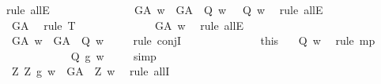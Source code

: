 \begin{isabellebody}
\ {\isacharparenleft}rule\ allE{\isacharparenright}\isanewline
\ \ \ \ \ \ \ \ \ \ \ \isamarkupfalse%
\ {}{\isacharcolon}\ {\isachardoublequoteopen}{\isacharparenleft}{\isasymP}\ G\isactrlsup A\ w\ {\isasymand}\ {\isacharparenleft}G\isactrlsup A\ {\isasymRrightarrow}\ Q{\isacharparenright}\ w{\isacharparenright}\ {\isasymlongrightarrow}\ {\isasymP}\ Q\ w{\isachardoublequoteclose}\ \isamarkupfalse%
\ {\isacharparenleft}rule\ allE{\isacharparenright}\isanewline
\ \ \ \ \ \ \ \ \ \ \ \isamarkupfalse%
\ {\isachardoublequoteopen}{\isasymlfloor}{\isasymP}\ G\isactrlsup A{\isasymrfloor}{\isachardoublequoteclose}\ \isamarkupfalse%
\ {\isacharparenleft}rule\ T{}{\isacharparenright}\isanewline
\ \ \ \ \ \ \ \ \ \ \ \isamarkupfalse%
\ {\isachardoublequoteopen}{\isasymP}\ G\isactrlsup A\ w{\isachardoublequoteclose}\ \isamarkupfalse%
\ {\isacharparenleft}rule\ allE{\isacharparenright}\isanewline
\ \ \ \ \ \ \ \ \ \ \ \isamarkupfalse%
\ {\isachardoublequoteopen}{\isasymP}\ G\isactrlsup A\ w\ {\isasymand}\ {\isacharparenleft}G\isactrlsup A\ {\isasymRrightarrow}\ Q{\isacharparenright}\ w{\isachardoublequoteclose}\ \isamarkupfalse%
\ {}\ \isamarkupfalse%
\ {\isacharparenleft}rule\ conjI{\isacharparenright}\isanewline
\ \ \ \ \ \ \ \ \ \ \ \isamarkupfalse%
\ {}\ this\ \isamarkupfalse%
\ {\isachardoublequoteopen}{\isasymP}\ Q\ w{\isachardoublequoteclose}\ \isamarkupfalse%
\ {\isacharparenleft}rule\ mp{\isacharparenright}\ %
\isanewline
\ \ \ \ \ \ \ \ \ \ \ \isamarkupfalse%
\ {\isachardoublequoteopen}{\isacharparenleft}\isactrlbold {\isasymbox}{\isacharparenleft}Q\ g{\isacharparenright}{\isacharparenright}\ w{\isachardoublequoteclose}\ \isamarkupfalse%
\ {}\ \isamarkupfalse%
\ simp\ \isanewline
\ \ \ \ \ \ \ \ \ \isamarkupfalse%
\ \ \ \ \isanewline
\ \ \ \ \ \isacommand{{\isacharbraceright}}\isamarkupfalse%
\ \isanewline
\ \ \ \ \ \isamarkupfalse%
\ \ {\isachardoublequoteopen}{\isasymforall}Z{\isachardot}\ {\isacharparenleft}\isactrlbold {\isasymbox}{\isacharparenleft}Z\ g{\isacharparenright}{\isacharparenright}\ w\ {\isasymlongleftrightarrow}\ {\isacharparenleft}G\isactrlsup A\ {\isasymRrightarrow}\ Z{\isacharparenright}\ w{\isachardoublequoteclose}\ \isamarkupfalse%
\ {\isacharparenleft}rule\ allI{\isacharparenright}\isanewline

\end{isabellebody}
